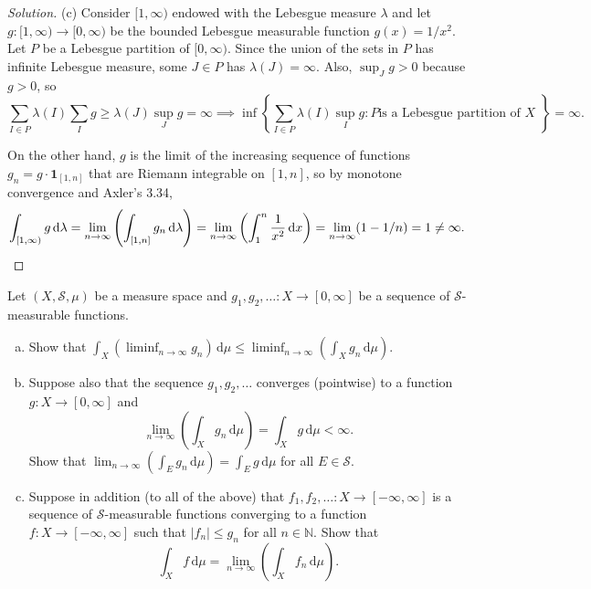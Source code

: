 \documentclass[10pt]{article}
\newcommand{\dd}{\,\mathrm{d}}
\providecommand{\NN}{\mathbb N}
\providecommand{\ii}{\item}
\newenvironment{soln}{\begin{proof}[Solution]}{\end{proof}}
\providecommand{\abs}[1]{\left|#1\right|}
\begin{document}
\begin{soln}
    (c) Consider $[1,\infty)$ endowed with the Lebesgue measure $\lambda$
    and let $g\colon[1,\infty)\to[0,\infty)$ be the bounded Lebesgue measurable
    function $g(x) = 1/x^2$.
    Let $P$ be a Lebesgue partition of $[0,\infty)$.
    Since the union of the sets in $P$
    has infinite Lebesgue measure, some $J\in P$ has $\lambda(J) = \infty$.
    Also, $\sup_Jg > 0$ because $g> 0$, so
    \begin{equation*}
	\sum_{I\in P} \lambda(I)\sum_{I}g\ge\lambda(J)\sup_Jg = \infty
	\implies \inf\left\{
	    \sum_{I\in P} \lambda(I)\sup_{I}g : P\text{
		is a Lebesgue partition of $X$
	    }
	\right\} = \infty.
    \end{equation*}

    On the other hand, $g$ is the limit of the increasing sequence of functions
    $g_n = g\cdot\mathbf 1_{[1,n]}$ that are Riemann integrable on $[1,n]$,
    so by monotone convergence and Axler's 3.34,
    \begin{equation*}
	\int_{[1,\infty)}g\dd\lambda =
	\lim_{n\to\infty}\left(\int_{[1,n]}g_n\dd\lambda\right) =
	\lim_{n\to\infty}\left(\int_1^n\frac{1}{x^2}\dd x\right) =
	\lim_{n\to\infty}(1 - 1/n) = 1\ne\infty.\qedhere
    \end{equation*}
\end{soln}

\pagebreak

\begin{problem}
    Let $(X,\mathcal S,\mu)$ be a measure space and
    $g_1,g_2,\dots\colon X\to[0,\infty]$ be a sequence
    of $\mathcal S$-measurable functions.
    \begin{enumerate}[(a)]
	\ii Show that $\int_X(\liminf_{n\to\infty}g_n)\dd\mu
	\le \liminf_{n\to\infty}(\int_Xg_n\dd\mu)$.
	\ii Suppose also that the sequence $g_1,g_2,\dots$ converges (pointwise)
	to a function $g\colon X\to[0,\infty]$ and
	\begin{equation*}
	    \lim_{n\to\infty}\left(\int_X g_n\dd\mu\right)
	    = \int_X g\dd\mu < \infty.
	\end{equation*}
	Show that $\lim_{n\to\infty}(\int_Eg_n\dd\mu) = \int_Eg\dd\mu$
	for all $E\in\mathcal S$.
	\ii Suppose in addition (to all of the above) that
	$f_1,f_2,\dots\colon X\to[-\infty,\infty]$ is a sequence
	of $\mathcal S$-measurable functions converging to
	a function $f\colon X\to[-\infty,\infty]$ such that
	$\abs{f_n} \le g_n$ for all $n\in\NN$. Show that
	\begin{equation*}
	    \int_Xf\dd\mu = \lim_{n\to\infty}\left(\int_Xf_n\dd\mu\right).
	\end{equation*}
\end{enumerate}
\end{problem}
\end{document}
